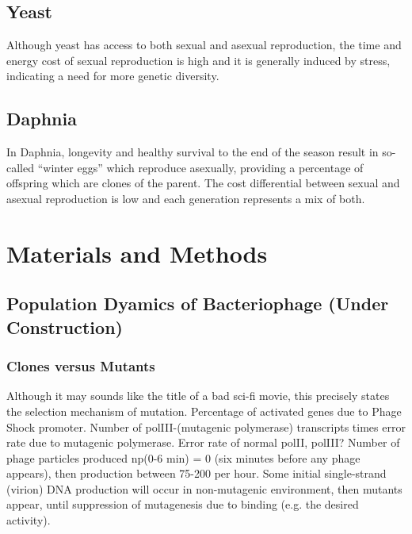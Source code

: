 \documentclass[10pt,letterpaper]{article}
\begin{document}
\subsection*{Yeast}
Although yeast has access to both sexual and asexual reproduction, the time and energy cost of sexual reproduction is high and it is generally induced by stress, indicating a need for more genetic diversity.
\subsection*{Daphnia} 
In Daphnia, longevity and healthy survival to the end of the season result in so-called ``winter eggs'' which reproduce asexually, providing a percentage of offspring which are clones of the parent. The cost differential between sexual and asexual reproduction is low and each generation represents a mix of both.

\section*{Materials and Methods}

\subsection*{Population Dyamics of Bacteriophage (Under Construction)}
\subsubsection*{Clones versus Mutants}
Although it may sounds like the title of a bad sci-fi movie, this precisely states the selection mechanism of mutation.
\newline
Percentage of activated genes due to Phage Shock promoter.
\newline
Number of polIII-(mutagenic polymerase) transcripts times error rate due to mutagenic polymerase.
\newline
Error rate of normal polII, polIII?
\newline
Number of phage particles produced np(0-6 min) = 0 (six minutes before any phage appears), then production between 75-200 per hour.
\newline
Some initial single-strand (virion) DNA production will occur in non-mutagenic environment, then mutants appear, until suppression of mutagenesis due to binding (e.g. the desired activity).

\end{document}
